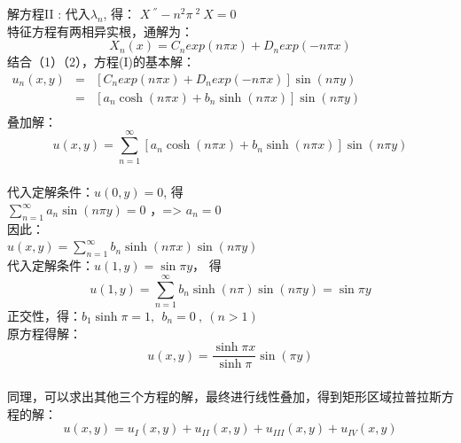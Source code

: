 \begin{frame}
	\frametitle{}	
	解方程II : 
	代入$\lambda_n$, 得：
	$\displaystyle  X~^{''} - n^2\pi~^2~X=0 $ \\
	特征方程有两相异实根，通解为： \\ 
	\begin{equation*}
		X_n(x)=C_n exp(n\pi x )+ D_n exp(-n\pi x )
	\end{equation*}	
	结合（1）（2），方程(I)的基本解：\\ 
	$\displaystyle \begin{array}{llll}
		u_n(x,y) &=& [C_n exp(n\pi x )+ D_n exp(-n\pi x )] \sin (n \pi y)  \\ 
		&=& [a_n \cosh (n\pi x )+ b_n \sinh(n\pi x ) ]\sin (n \pi y)  \\ 
	\end{array}$ \\
	叠加解：
	\begin{equation*}
		u(x, y)   = \sum\limits_{n=1}^{\infty }  [a_n \cosh (n\pi x )+ b_n \sinh (n\pi x ) ] \sin (n \pi y)  
	\end{equation*}	
\end{frame}	

\begin{frame}
	\frametitle{}	
	代入定解条件：$ u(0,y)=0$, 得 \\
	$ \sum\limits_{n=1}^{\infty }  a_n  \sin (n \pi y) =0 $ ，=> $ a_n=0$ \\
	因此：\\
	$	u(x,y)    = \sum\limits_{n=1}^{\infty }  b_n \sinh (n\pi x )  \sin (n \pi y)  $ \\ 
	代入定解条件：$u(1,y) = \sin \pi y $， 得
	\begin{equation*}
		u(1,y)    = \sum\limits_{n=1}^{\infty }  b_n \sinh (n\pi )  \sin (n \pi y)  = \sin \pi y
	\end{equation*}
	正交性，得：$ b_1\sinh\pi =1,~~ b_n=0~,~ (n>1)$	\\ 
	原方程得解：
	\begin{equation*}
		u(x,y)    = \dfrac{\sinh \pi x}{\sinh \pi}  \sin ( \pi y) 
	\end{equation*}	
\end{frame}	

\begin{frame}
	\frametitle{}	
	同理，可以求出其他三个方程的解，最终进行线性叠加，得到矩形区域拉普拉斯方程的解：
	\begin{equation*}
		u(x,y)    = u_I (x,y)  +   u_{II}(x,y)  + u_{III}(x,y)  + u_{IV}(x,y)  
	\end{equation*}	
\end{frame}	


